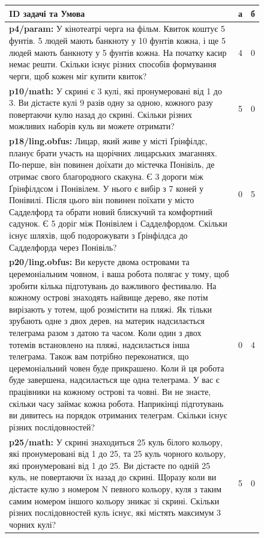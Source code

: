 \begin{figure}[!h]
    \centering
    \small
    \label{tab:problems-poorly-solved}
    \begin{tabular}{|p{14cm}|c|c|}
        \hline
        \textbf{ID задачі та Умова} & \textbf{а} & \textbf{б} \\
        \hline
        \textbf{p4/param:} У кінотеатрі черга на фільм. Квиток коштує 5 фунтів. 5 людей мають банкноту у 10 фунтів кожна, і ще 5 людей мають банкноту у 5 фунтів кожна. На початку касир немає решти. Скільки існує різних способів формування черги, щоб кожен міг купити квиток? & 4 & 0 \\
        \hline
        \textbf{p10/math:} У скрині є 3 кулі, які пронумеровані від 1 до 3. Ви дістаєте кулі 9 разів одну за одною, кожного разу повертаючи кулю назад до скрині. Скільки різних можливих наборів куль ви можете отримати? & 5 & 0 \\
        \hline
        \textbf{p18/ling.obfus:} Лицар, який живе у місті Ґрінфілдс, планує брати участь на щорічних лицарських змаганнях. По-перше, він повинен доїхати до містечка Понівіль, де отримає свого благородного скакуна. Є 3 дороги між Ґрінфілдсом і Понівілем. У нього є вибір з 7 коней у Понівилі. Після цього він повинен поїхати у місто Садделфорд та обрати новий блискучий та комфортний садунок. Є 5 доріг між Понівілем і Садделфордом. Скільки існує шляхів, щоб подорожувати з Ґрінфілдса до Садделфорда через Понівіль? & 0 & 5 \\
        \hline
        \textbf{p20/ling.obfus:} Ви керуєте двома островами та церемоніальним човном, і ваша робота полягає у тому, щоб зробити кілька підготувань до важливого фестивалю. На кожному острові знаходять найвище дерево, яке потім вирізають у тотем, щоб розмістити на пляжі. Як тільки зрубають одне з двох дерев, на материк надсилається телеграма разом з датою та часом. Коли один з двох тотемів встановлено на пляжі, надсилається інша телеграма. Також вам потрібно переконатися, що церемоніальний човен буде прикрашено. Коли й ця робота буде завершена, надсилається ще одна телеграма. У вас є працівники на кожному острові та човні. Ви не знаєте, скільки часу займає кожна робота. Наприкінці підготувань ви дивитесь на порядок отриманих телеграм. Скільки існує різних послідовностей? & 0 & 4 \\
        \hline
        \textbf{p25/math:} У скрині знаходиться 25 куль білого кольору, які пронумеровані від 1 до 25, та 25 куль чорного кольору, які пронумеровані від 1 до 25. Ви дістаєте по одній 25 куль, не повертаючи їх назад до скрині. Щоразу коли ви дістаєте кулю з номером N певного кольору, куля з таким самим номером іншого кольору зникає зі скрині. Скільки різних послідовностей куль існує, які містять максимум 3 чорних кулі? & 5 & 0 \\
        \hline
    \end{tabular}
\end{figure}

